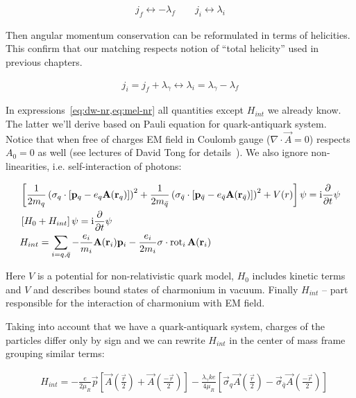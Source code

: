 \begin{align}
    j_f \leftrightarrow -\lambda_f \qquad j_i \leftrightarrow \lambda_i
\end{align}

Then angular momentum conservation can be reformulated in terms of helicities. This confirm that our matching respects notion of ``total helicity'' used in previous chapters.

\begin{align}
    j_i = j_f + \lambda_\gamma \leftrightarrow \lambda_i = \lambda_\gamma - \lambda_f
\end{align}

In expressions~\cref{eq:dw-nr,eq:mel-nr} all quantities except $H_{int}$ we already know. The latter we'll derive based on Pauli equation for quark-antiquark system. Notice that when free of charges EM field in Coulomb gauge ($\nabla\cdot\vec{A} = 0$) respects $A_0 = 0$ as well (see lectures of David Tong for details~\cite{tong-qed}). We also ignore non-linearities, i.e. self-interaction of photons:

\begin{align}
    &\left[\frac{1}{2m_q} \left( \mathbf{\sigma}_q \cdot [\mathbf{p}_q - e_q \mathbf{A}(\mathbf{r}_q)] \right)^2 + \frac{1}{2m_{\bar{q}}} \left( \mathbf{\sigma}_{\bar{q}} \cdot [\mathbf{p}_{\bar{q}} - e_{\bar{q}} \mathbf{A}(\mathbf{r}_{\bar{q}})] \right)^2 + V(r) \right] \psi = \mathrm{i} \pdv{t} \psi \\
    &\left[H_0 + H_{int} \right] \psi= \mathrm{i} \pdv{t} \psi \\
    &H_{int} = \sum_{i = q, \bar{q}} -\frac{e_i}{m_i} \mathbf{A}(\mathbf{r}_i) \mathbf{p}_i - \frac{e_i}{2 m_i} \mathbf{\sigma} \cdot \operatorname{rot}_i \mathbf{A}(\mathbf{r}_i)
\end{align}

Here $V$ is a potential for non-relativistic quark model, $H_0$ includes kinetic terms and $V$ and describes bound states of charmonium in vacuum. Finally $H_{int}$ -- part responsible for the interaction of charmonium with EM field.

Taking into account that we have a quark-antiquark system, charges of the particles differ only by sign and we can rewrite $H_{int}$ in the center of mass frame grouping similar terms:

\begin{align} \label{eq:hint-nomult}
    &H_{int} = -\frac{e}{2 \mu_R} \vec{p} \left[ \vec{A}(\frac{\vec{r}}{2}) + \vec{A}(\frac{-\vec{r}}{2}) \right]-\frac{\lambda_\gamma k e}{4 \mu_R}\left[ \vec{\sigma}_q \vec{A}(\frac{\vec{r}}{2}) - \vec{\sigma}_{\bar{q}} \vec{A}(\frac{-\vec{r}}{2}) \right]
\end{align}

